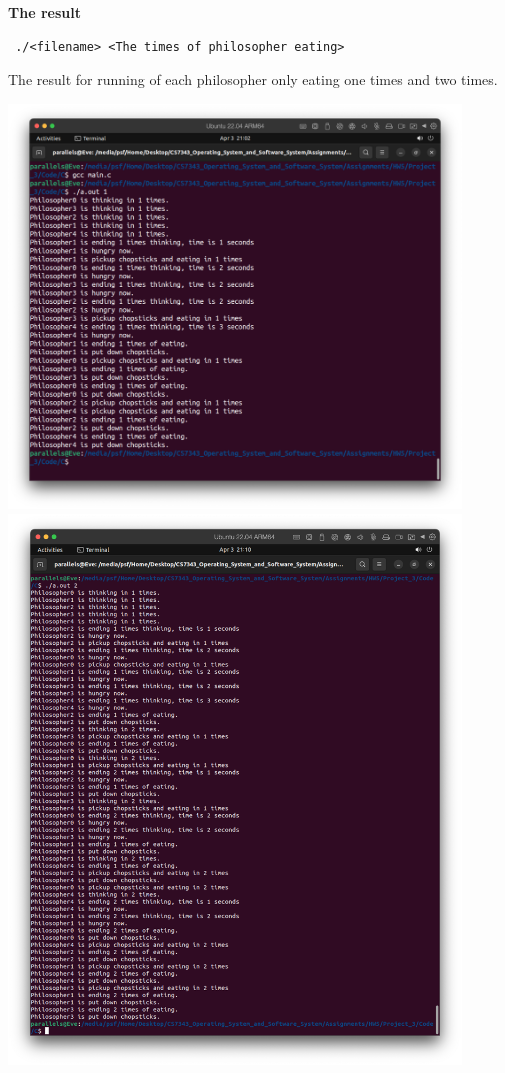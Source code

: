 \documentclass[12pt]{article}
\newenvironment{sol}[1][Solution]{\begin{trivlist}\item[\hskip\labelsep {\bfseries #1:}]}{\end{trivlist}}
\begin{document}
\begin{sol}
\begin{verbatim}
    \end{verbatim}
        \textbf{The result}
    \begin{verbatim}
 ./<filename> <The times of philosopher eating>
    \end{verbatim}
    The result for running of each philosopher only eating one times and two times.
    \begin{center}
        \includegraphics[width=0.9\textwidth]{2.png}
        \includegraphics[width=0.9\textwidth]{22.png}
    \end{center}
    \end{sol}
\end{document}
